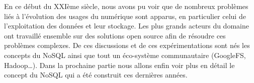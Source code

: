 En ce début du XXIème siècle, nous avons pu voir que de nombreux problèmes liés à l'évolution des usages du numérique sont apparus, en particulier celui de l'exploitation des données et leur stockage. Les plus grands acteurs du domaine ont travaillé ensemble sur des solutions open source afin de résoudre ces problèmes complexes. De ces discussions et de ces expérimentations sont nés les concepts du NoSQL ainsi que tout un éco-système communautaire (GoogleFS, Hadoop\dots). Dans la prochaine partie nous allons enfin voir plus en détail le concept du NoSQL qui a été construit ces dernières années.

